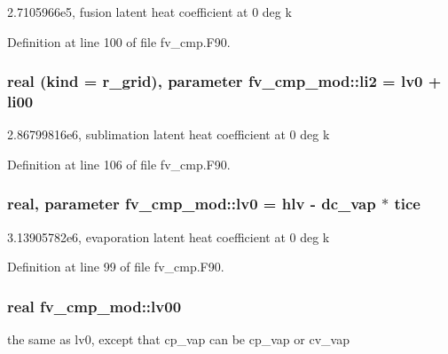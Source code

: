 \begin{DoxyItemize}
\item 2.\-7105966e5, fusion latent heat coefficient at 0 deg k 
\end{DoxyItemize}

Definition at line 100 of file fv\-\_\-cmp.\-F90.

\subsubsection[{li2}]{\setlength{\rightskip}{0pt plus 5cm}real (kind = r\-\_\-grid), parameter fv\-\_\-cmp\-\_\-mod\-::li2 = {\bf lv0} + {\bf li00}\hspace{0.3cm}{\ttfamily [private]}}\label{classfv__cmp__mod_a9248700d4484999739228f7448428746}


2.\-86799816e6, sublimation latent heat coefficient at 0 deg k 



Definition at line 106 of file fv\-\_\-cmp.\-F90.

\subsubsection[{lv0}]{\setlength{\rightskip}{0pt plus 5cm}real, parameter fv\-\_\-cmp\-\_\-mod\-::lv0 = hlv -\/ {\bf dc\-\_\-vap} $\ast$ {\bf tice}\hspace{0.3cm}{\ttfamily [private]}}\label{classfv__cmp__mod_ac555be1714d90016ac1b76bd0274fe4d}


3.\-13905782e6, evaporation latent heat coefficient at 0 deg k 



Definition at line 99 of file fv\-\_\-cmp.\-F90.

\subsubsection[{lv00}]{\setlength{\rightskip}{0pt plus 5cm}real fv\-\_\-cmp\-\_\-mod\-::lv00\hspace{0.3cm}{\ttfamily [private]}}\label{classfv__cmp__mod_a7bcead849f7cab25637af6d3b1db833a}


the same as lv0, except that cp\-\_\-vap can be cp\-\_\-vap or cv\-\_\-vap 



